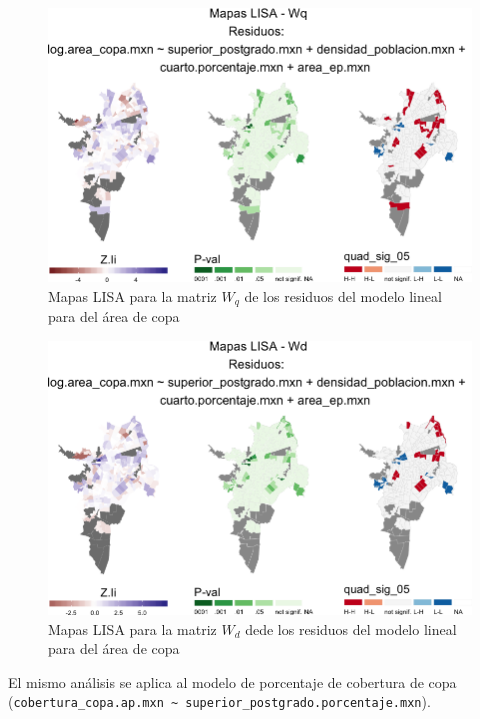 \documentclass[12pt,]{book}
\begin{document}
\begin{figure}
\includegraphics[width=1\linewidth]{tesis-unigis_files/figure-latex/mapas-lisa-rescopa-wq-1} \caption{Mapas LISA para la matriz $W_q$ de los residuos del modelo lineal para del área de copa}\label{fig:mapas-lisa-rescopa-wq}
\end{figure}

\begin{figure}
\includegraphics[width=1\linewidth]{tesis-unigis_files/figure-latex/mapas-lisa-rescopa-wd-1} \caption{Mapas LISA para la matriz $W_d$ dede los residuos del modelo lineal para del área de copa}\label{fig:mapas-lisa-rescopa-wd}
\end{figure}

El mismo análisis se aplica al modelo de porcentaje de cobertura de copa
(\texttt{cobertura\_copa.ap.mxn\ \textasciitilde{}\ superior\_postgrado.porcentaje.mxn}).
\end{document}
